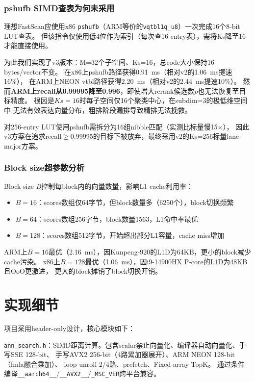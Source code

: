 \documentclass[11pt,a4paper]{article}
\begin{document}
\subsubsection{pshufb SIMD查表为何未采用}

理想FastScan应使用x86 \texttt{pshufb}（ARM等价的\texttt{vqtbl1q\_u8}）一次完成16个8-bit LUT查表。
但该指令仅使用低4位作为索引（每次查16-entry表），需将Ks降至16才能直接使用。

为此我们实现了v3版本：M=32个子空间、Ks=16，总code大小保持16 bytes/vector不变。
在x86上pshufb路径获得0.91~ms（相对v2的1.06~ms提速16\%），
在ARM上NEON vtbl路径获得2.20~ms（相对v2的2.44~ms提速10\%）。
然而\textbf{ARM上recall从0.99995降至0.996}，即使增大rerank候选数$p$也无法恢复至目标精度。
根因是$Ks=16$时每子空间仅16个聚类中心，在subdim=3的极低维空间中
无法有效表达向量分布，粗排阶段漏排导致精排无法挽救。

对256-entry LUT使用pshufb需拆分为16组nibble匹配（实测比标量慢15$\times$），
因此v3方案在追求recall$\geq$0.99995的目标下被放弃，最终采用v2的Ks=256标量lane-major方案。

\subsubsection{Block size超参数分析}

Block size $B$控制每block内的向量数量，影响L1 cache利用率：
\begin{itemize}[nosep]
    \item $B=16$：scores数组仅64字节，但block数量多（6250个），block切换频繁
    \item $B=64$：scores数组256字节，block数量1563，L1命中率最优
    \item $B=128$：scores数组512字节，开始超出部分L1容量，cache miss增加
\end{itemize}
ARM上$B=16$最优（2.16~ms），因Kunpeng-920的L1D为64KB，更小的block减少cache污染。
x86上$B=128$最优（1.06~ms），因i9-14900HX P-core的L1D为48KB且OoO更激进，
更大的block摊销了block切换开销。

\section{实现细节}
项目采用header-only设计，核心模块如下：

\texttt{ann\_search.h}：SIMD距离计算。包含scalar禁止向量化、编译器自动向量化、手写SSE 128-bit、
手写AVX2 256-bit（4路累加器展开）、ARM NEON 128-bit（fmla融合乘加）、
loop unroll 2/4路、prefetch、Fixed-array TopK。
通过条件编译\texttt{\_\_aarch64\_\_}/\texttt{\_\_AVX2\_\_}/\texttt{\_MSC\_VER}跨平台兼容。
\end{document}
